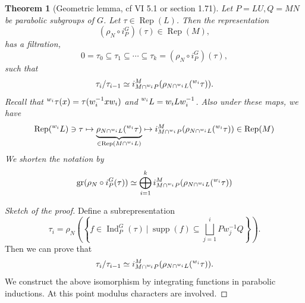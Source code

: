 \documentclass[8pt]{article}
\newtheorem{theorem}{Theorem} [section]
\DeclareMathOperator{\Ind}{Ind}
\DeclareMathOperator{\Rep}{Rep}
\DeclareMathOperator{\supp}{supp}
\DeclareMathOperator{\gr}{gr}
\newcommand{\sep}[0]{\:|\:}
\begin{document}
\begin{theorem}[Geometric lemma, cf \cite{Renard} VI 5.1 or \cite{Roche} section 1.71]
  \label{geometric_lemma}
  Let $P=LU,Q=MN$ be parabolic subgroups of $G$. Let $\tau\in\Rep(L)$. Then the representation
  \begin{equation*}
  (\rho_N\circ i_P^G)(\tau)\in\Rep(M),
  \end{equation*}
  has a filtration,
  \begin{equation*}
    0=\tau_0\subseteq \tau_1\subseteq\cdots\subseteq \tau_k = (\rho_N\circ i_P^G)(\tau),
  \end{equation*}
  such that 
  \begin{equation*}
    \tau_i/\tau_{i-1}\simeq i_{M\cap\prescript{w_i}{}{P}}^M(\rho_{N\cap \prescript{w_i}{}{L}}(\prescript{w_i}{}{\tau})).
  \end{equation*}
  Recall that $\prescript{w_i}{}{\tau}(x) = \tau(w_i^{-1}xw_i)$ and $\prescript{w_i}{}{L} = w_iLw_i^{-1}$. Also under these maps, we have 
  \begin{equation*}
    \Rep(\prescript{w_i}{}{L})\ni\tau\mapsto \underbrace{\rho_{N\cap \prescript{w_i}{}{L}}(\prescript{w_i}{}{\tau})}_{\in\Rep(M\cap \prescript{w_i}{}{L})}\mapsto i_{M\cap\prescript{w_i}{}{P}}^M(\rho_{N\cap \prescript{w_i}{}{L}}(\prescript{w_i}{}{\tau}))\in\Rep(M)
  \end{equation*}
  We shorten the notation by 
  \begin{equation*}
  \gr(\rho_N\circ i_P^G(\tau))\simeq \bigoplus_{i=1}^ki_{M\cap \prescript{w_i}{}{P}}^M(\rho_{N\cap\prescript{w_i}{}{L}}(\prescript{w_i}{}{\tau}))
  \end{equation*}
\end{theorem}
\begin{proof}[Sketch of the proof]
  Define a subrepresentation 
  \begin{equation*}
  \tau_i = \rho_N\left(\left\{f\in\Ind_P^G(\tau)\sep \supp(f)\subseteq\bigsqcup_{j=1}^iPw_j^{-1}Q\right\}\right).
  \end{equation*}
  Then we can prove that 
  \begin{equation*}
    \tau_i/\tau_{i-1}\simeq i_{M\cap\prescript{w_i}{}{P}}^M(\rho_{N\cap\prescript{w_i}{}{L}}(\prescript{w_i}{}{\tau})).
  \end{equation*}
  We construct the above isomorphism by integrating functions in parabolic inductions. At this point modulus characters are involved.
\end{proof}

\end{document}
